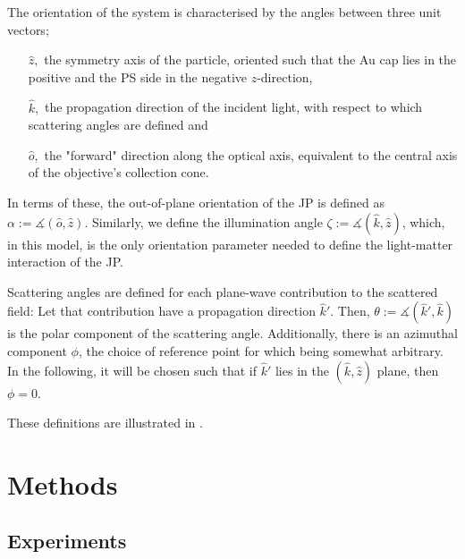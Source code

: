 \documentclass[10pt]{article}
\begin{document}
\begin{multicols}{2}
The orientation of the system is characterised by the angles between three unit vectors;
\begin{itemize}
    \item[$\hat{z},$] the symmetry axis of the particle, oriented such that the Au cap lies in the positive and the PS side in the negative $z$-direction, 
    \item[$\hat{k},$] the propagation direction of the incident light, with respect to which scattering angles are defined and
    \item[$\hat{o},$] the "forward" direction along the optical axis, equivalent to the central axis of the objective's collection cone. 
\end{itemize}
In terms of these, the out-of-plane orientation of the JP is defined as
$\alpha := \measuredangle( \hat{o}, \hat{z} )$.
Similarly, we define the illumination angle 
$\zeta := \measuredangle( \hat{k}, \hat{z} )$, 
which, in this model, is the only orientation parameter needed to define the light-matter interaction of the JP. 

Scattering angles are defined for each plane-wave contribution to the scattered field: 
Let that contribution have a propagation direction $\hat{k}'$. 
Then, \mbox{$\theta := \measuredangle( \hat{k}', \hat{k} )$} is the polar component of the scattering angle. 
Additionally, there is an azimuthal component $\phi$, the choice of reference point for which being somewhat arbitrary. 
In the following, it will be chosen such that if $\hat{k}'$ lies in the $(\hat{k},\hat{z})$ plane, then $\phi=0$.

These definitions are illustrated in . 



\section*{Methods}






\subsection*{Experiments}


\end{multicols}
\end{document}

